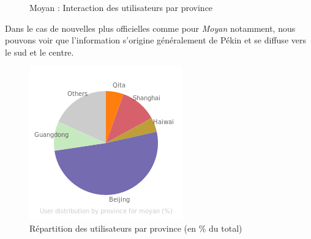 \begin{figure}
    \centering

     


    \caption{
        Moyan : Interaction des utilisateurs par province   
    }

\end{figure}


Dans le cas de nouvelles plus officielles comme pour \textit{Moyan
}notamment, nous pouvons voir que l{\textquoteright}information
s{\textquoteright}origine g\'en\'eralement de P\'ekin et se diffuse
vers le sud et le centre. 

\begin{figure}
    \centering
    \includegraphics[width=2.6043in,height=2.6043in]{figures/chap4/chapitre4-img39.png}
  \caption{
    R\'epartition des utilisateurs par province (en \% du total)\\
  }
\end{figure}


